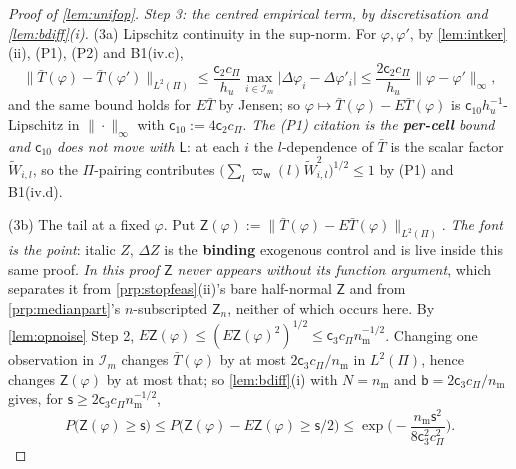\begin{proof}[Proof of \cref{lem:unifop}]
\emph{Step 3: the centred empirical term, by discretisation and \cref{lem:bdiff}(i).}
(3a) Lipschitz continuity in the sup-norm. For $\varphi,\varphi'$, by \cref{lem:intker}(ii),
(P1), (P2) and B1(iv.c),
\[
\big\|\bar T(\varphi)-\bar T(\varphi')\big\|_{L^{2}(\Pi)}
\le\frac{\mathsf c_2c_\Pi}{h_u}\max_{i\in\mathcal I_m}\big|\Delta\varphi_i-\Delta\varphi'_i\big|
\le\frac{2\mathsf c_2c_\Pi}{h_u}\big\|\varphi-\varphi'\big\|_\infty ,
\]
and the same bound holds for $E\bar T$ by Jensen; so
$\varphi\mapsto\bar T(\varphi)-E\bar T(\varphi)$ is $\mathsf c_{10}h_u^{-1}$-Lipschitz in
$\|\cdot\|_\infty$ with $\mathsf c_{10}:=4\mathsf c_2c_\Pi$. \emph{The (P1) citation is the
\textbf{per-cell} bound and $\mathsf c_{10}$ does not move with $\mathsf L$}: at each $i$ the
$l$-dependence of $\bar T$ is the scalar factor $\widetilde W_{i,l}$, so the $\Pi$-pairing contributes
$\big(\sum_l\varpi_{\mathsf w}(l)\widetilde W_{i,l}^{2}\big)^{1/2}\le1$ by (P1) and B1(iv.d).

(3b) The tail at a fixed $\varphi$. Put
$\mathsf Z(\varphi):=\|\bar T(\varphi)-E\bar T(\varphi)\|_{L^{2}(\Pi)}$.
\emph{The font is the point}: italic $Z$, $\Delta Z$ is the \textbf{binding} exogenous control and is
live inside this same proof. \emph{In this proof $\mathsf Z$ never appears without
its function argument}, which separates it from \cref{prp:stopfeas}\textup{(ii)}'s bare half-normal
$\mathsf Z$ and from \cref{prp:medianpart}'s $n$-subscripted $\mathsf Z_n$, neither of which occurs here.
By \cref{lem:opnoise} Step 2,
$E\mathsf Z(\varphi)\le(E\mathsf Z(\varphi)^{2})^{1/2}\le\mathsf c_3c_\Pi n_{\mathrm m}^{-1/2}$.
Changing one observation in $\mathcal I_m$ changes $\bar T(\varphi)$ by at most
$2\mathsf c_3c_\Pi/n_{\mathrm m}$ in $L^{2}(\Pi)$, hence changes $\mathsf Z(\varphi)$ by at most that; so
\cref{lem:bdiff}(i) with $N=n_{\mathrm m}$ and $\mathsf b=2\mathsf c_3c_\Pi/n_{\mathrm m}$ gives, for
$\mathsf s\ge2\mathsf c_3c_\Pi n_{\mathrm m}^{-1/2}$,
\begin{equation}\label{eq:bdtail}
P\big(\mathsf Z(\varphi)\ge\mathsf s\big)\le P\big(\mathsf Z(\varphi)-E\mathsf Z(\varphi)\ge\mathsf s/2\big)
\le\exp\Big(-\frac{n_{\mathrm m}\mathsf s^{2}}{8\mathsf c_3^{2}c_\Pi^{2}}\Big).
\end{equation}


\end{proof}
